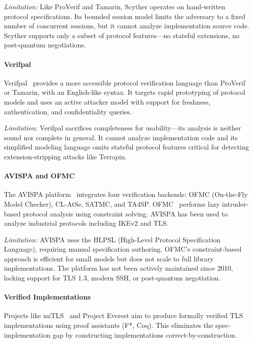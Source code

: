 \documentclass[10pt,twocolumn]{article}
\begin{document}
\emph{Limitation:} Like ProVerif and Tamarin, Scyther operates on hand-written protocol specifications. Its bounded session model limits the adversary to a fixed number of concurrent sessions, but it cannot analyze implementation source code. Scyther supports only a subset of protocol features—no stateful extensions, no post-quantum negotiations.

\paragraph{Verifpal}
Verifpal~\cite{kobeissi2020verifpal} provides a more accessible protocol verification language than ProVerif or Tamarin, with an English-like syntax. It targets rapid prototyping of protocol models and uses an active attacker model with support for freshness, authentication, and confidentiality queries.

\emph{Limitation:} Verifpal sacrifices completeness for usability—its analysis is neither sound nor complete in general. It cannot analyze implementation code and its simplified modeling language omits stateful protocol features critical for detecting extension-stripping attacks like Terrapin.

\paragraph{AVISPA and OFMC}
The AVISPA platform~\cite{armando2005avispa} integrates four verification backends: OFMC (On-the-Fly Model Checker), CL-AtSe, SATMC, and TA4SP. OFMC~\cite{basin2005ofmc} performs lazy intruder-based protocol analysis using constraint solving. AVISPA has been used to analyze industrial protocols including IKEv2 and TLS.

\emph{Limitation:} AVISPA uses the HLPSL (High-Level Protocol Specification Language), requiring manual specification authoring. OFMC's constraint-based approach is efficient for small models but does not scale to full library implementations. The platform has not been actively maintained since 2010, lacking support for TLS 1.3, modern SSH, or post-quantum negotiation.

\paragraph{Verified Implementations}
Projects like miTLS~\cite{bhargavan2013mitls} and Project Everest aim to produce formally verified TLS implementations using proof assistants (F*, Coq). This eliminates the spec-implementation gap by constructing implementations correct-by-construction.
\end{document}
